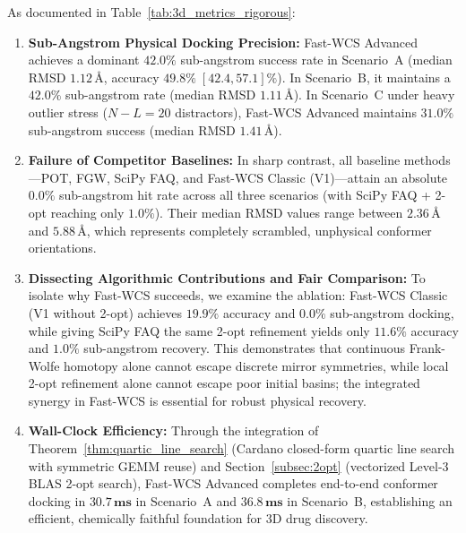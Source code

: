 \documentclass[conference]{IEEEtran}
\begin{document}
As documented in Table~\ref{tab:3d_metrics_rigorous}:
\begin{enumerate}
    \item \textbf{Sub-Angstrom Physical Docking Precision:} Fast-WCS Advanced achieves a dominant $\mathbf{42.0\%}$ sub-angstrom success rate in Scenario~A (median RMSD $1.12\,\text{\AA}$, accuracy $49.8\% \; [42.4, 57.1]\%$). In Scenario~B, it maintains a $\mathbf{42.0\%}$ sub-angstrom rate (median RMSD $1.11\,\text{\AA}$). In Scenario~C under heavy outlier stress ($N - L = 20$ distractors), Fast-WCS Advanced maintains $\mathbf{31.0\%}$ sub-angstrom success (median RMSD $1.41\,\text{\AA}$).
    \item \textbf{Failure of Competitor Baselines:} In sharp contrast, all baseline methods—POT, FGW, SciPy FAQ, and Fast-WCS Classic (V1)—attain an absolute $\mathbf{0.0\%}$ sub-angstrom hit rate across all three scenarios (with SciPy FAQ + 2-opt reaching only $1.0\%$). Their median RMSD values range between $2.36\,\text{\AA}$ and $5.88\,\text{\AA}$, which represents completely scrambled, unphysical conformer orientations.
    \item \textbf{Dissecting Algorithmic Contributions and Fair Comparison:} To isolate why Fast-WCS succeeds, we examine the ablation: Fast-WCS Classic (V1 without 2-opt) achieves $19.9\%$ accuracy and $0.0\%$ sub-angstrom docking, while giving SciPy FAQ the same 2-opt refinement yields only $11.6\%$ accuracy and $1.0\%$ sub-angstrom recovery. This demonstrates that continuous Frank-Wolfe homotopy alone cannot escape discrete mirror symmetries, while local 2-opt refinement alone cannot escape poor initial basins; the integrated synergy in Fast-WCS is essential for robust physical recovery.
    \item \textbf{Wall-Clock Efficiency:} Through the integration of Theorem~\ref{thm:quartic_line_search} (Cardano closed-form quartic line search with symmetric GEMM reuse) and Section~\ref{subsec:2opt} (vectorized Level-3 BLAS 2-opt search), Fast-WCS Advanced completes end-to-end conformer docking in $\mathbf{30.7\,\text{ms}}$ in Scenario~A and $\mathbf{36.8\,\text{ms}}$ in Scenario~B, establishing an efficient, chemically faithful foundation for 3D drug discovery.
\end{enumerate}
\end{document}

